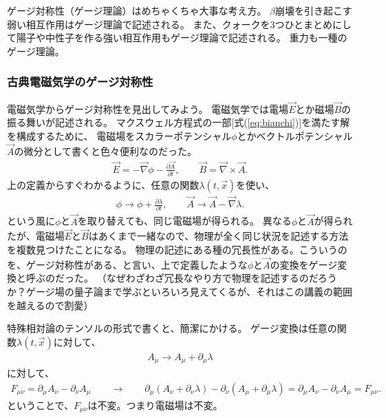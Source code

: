 \documentclass[10pt,a4paper]{jarticle}
\begin{document}
ゲージ対称性（ゲージ理論）はめちゃくちゃ大事な考え方。
$\beta$崩壊を引き起こす弱い相互作用はゲージ理論で記述される。
また、クォークを3つひとまとめにして陽子や中性子を作る強い相互作用もゲージ理論で記述される。
重力も一種のゲージ理論。\cite{kazama, fukaya}

\subsubsection{古典電磁気学のゲージ対称性}
電磁気学からゲージ対称性を見出してみよう。
電磁気学では電場$\vec E$とか磁場$\vec B$の振る舞いが記述される。
マクスウェル方程式の一部[式(\ref{eq:bianchi})]を満たす解を構成するために、
電磁場をスカラーポテンシャル$\phi$とかベクトルポテンシャル$\vec A$の微分として書くと色々便利なのだった。
\begin{align}
\vec E = -\vec\nabla\phi - \frac{\partial\vec A}{\partial t}, \qquad
\vec B = \vec \nabla \times \vec A.
\end{align}
%
上の定義からすぐわかるように、任意の関数$\lambda(t,\vec x)$を使い、
\begin{align}
\phi \to \phi + \frac{\partial \lambda}{\partial t}, \qquad
\vec A \to \vec A - \vec \nabla \lambda.
\end{align}
という風に$\phi$と$\vec A$を取り替えても、同じ電磁場が得られる。
異なる$\phi$と$\vec A$が得られたが、電磁場$\vec E$と$\vec B$はあくまで一緒なので、物理が全く同じ状況を記述する方法を複数見つけたことになる。
物理の記述にある種の冗長性がある。こういうのを、ゲージ対称性がある、と言い、上で定義したような$\phi$と$\vec A$の変換をゲージ変換と呼ぶのだった。
（なぜわざわざ冗長なやり方で物理を記述するのだろうか？ゲージ場の量子論まで学ぶといろいろ見えてくるが、それはこの講義の範囲を越えるので割愛）

特殊相対論のテンソルの形式で書くと、簡潔にかける。
ゲージ変換は任意の関数$\lambda(t,\vec x)$に対して、
\begin{align}
A_\mu \to A_\mu + \partial_\mu \lambda
\end{align}
に対して、
\begin{align}
F_{\mu\nu} = \partial_\mu A_\nu - \partial_\nu A_\mu
\qquad\to \qquad
\partial_\mu ( A_\nu + \partial_\nu \lambda) - \partial_\nu (A_\mu + \partial_\mu \lambda)
= \partial_\mu A_\nu - \partial_\nu A_\mu
= F_{\mu\nu}.
\end{align}
ということで、$F_{\mu\nu}$は不変。つまり電磁場は不変。
\end{document}
